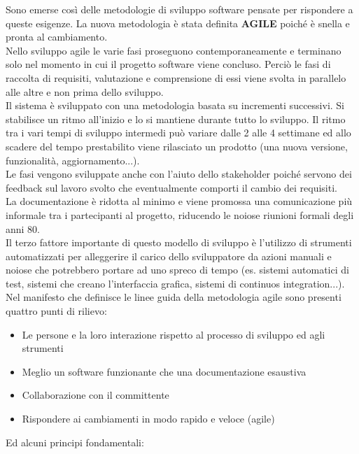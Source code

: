 Sono emerse così delle metodologie di sviluppo software pensate per rispondere a queste esigenze.
La nuova metodologia è stata definita \textbf{AGILE} poiché è snella e pronta al cambiamento.\\
Nello sviluppo agile le varie fasi proseguono contemporaneamente e terminano solo nel momento in cui il progetto software viene concluso.
Perciò le fasi di raccolta di requisiti, valutazione e comprensione di essi viene svolta in parallelo alle altre e non prima dello sviluppo.\\
Il sistema è sviluppato con una metodologia basata su incrementi successivi.
Si stabilisce un ritmo all'inizio e lo si mantiene durante tutto lo sviluppo.
Il ritmo tra i vari tempi di sviluppo intermedi può variare dalle 2 alle 4 settimane ed allo scadere del tempo prestabilito viene rilasciato un prodotto (una nuova versione, funzionalità, aggiornamento...).\\
Le fasi vengono sviluppate anche con l'aiuto dello stakeholder poiché servono dei feedback sul lavoro svolto che eventualmente comporti il cambio dei requisiti.\\
La documentazione è ridotta al minimo e viene promossa una comunicazione più informale tra i partecipanti al progetto, riducendo le noiose riunioni formali degli anni 80.\\
Il terzo fattore importante di questo modello di sviluppo è l'utilizzo di strumenti automatizzati per alleggerire il carico dello sviluppatore da azioni manuali e noiose che potrebbero portare ad uno spreco di tempo (es. sistemi automatici di test, sistemi che creano l'interfaccia grafica, sistemi di continuos integration...).
Nel manifesto che definisce le linee guida della metodologia agile sono presenti quattro punti di rilievo:
\begin{itemize}[noitemsep]
    \item Le persone e la loro interazione rispetto al processo di sviluppo ed agli strumenti
    \item Meglio un software funzionante che una documentazione esaustiva
    \item Collaborazione con il committente
    \item Rispondere ai cambiamenti in modo rapido e veloce (agile)
\end{itemize}
Ed alcuni principi fondamentali:
